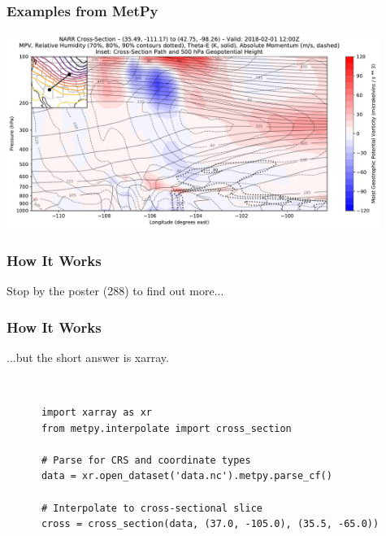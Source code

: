 \documentclass[aspectratio=169]{beamer}
\begin{document}
\begin{frame}
    \frametitle{Examples from MetPy}
    \begin{center}
        \includegraphics[height=2.5in]{figures/csi_example_narr.pdf}
    \end{center}
\end{frame}

\begin{frame}
    \frametitle{How It Works}
    Stop by the poster (288) to find out more...
\end{frame}

\begin{frame}[fragile]
    \frametitle{How It Works}
    ...but the short answer is xarray.
    
    \ 
    
    \begin{verbatim}
      import xarray as xr
      from metpy.interpolate import cross_section

      # Parse for CRS and coordinate types
      data = xr.open_dataset('data.nc').metpy.parse_cf()

      # Interpolate to cross-sectional slice
      cross = cross_section(data, (37.0, -105.0), (35.5, -65.0))
    \end{verbatim}
\end{frame}
\end{document}
